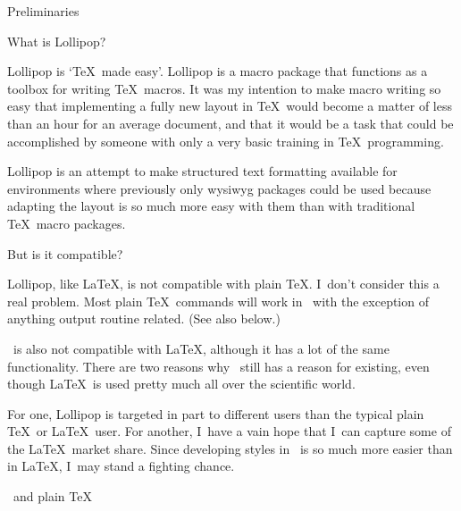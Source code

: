 %
%
%
%
%
%
 Preliminaries

\Section What is Lollipop?

Lollipop is `\TeX\ made easy'. Lollipop is a macro package
that functions as a toolbox for writing \TeX\ macros. It was my
intention to make macro writing so easy that implementing a fully new
layout in \TeX\ would become a matter of less than an hour for an
average document, and that it would be a task that could be
accomplished by someone with only a very basic training in \TeX\
programming.

Lollipop is an attempt to make structured text formatting available
for environments where previously only wysiwyg packages could be used
because adapting the layout is so much more easy with them than with
traditional \TeX\ macro packages.

\Section But is it compatible?

Lollipop, like \LaTeX, is not compatible with plain \TeX. I~don't
consider this a real problem. Most plain \TeX\ commands will work in
\Lollipop\ with the exception of anything output routine related.
(See also below.)

\Lollipop\ is also not compatible with \LaTeX, although it has a lot
of the same functionality. There are two reasons why \Lollipop\ still
has a reason for existing, even though \LaTeX\ is used pretty much
all over the scientific world.

For one, Lollipop is targeted in part
to different users than the typical plain \TeX\ or
\LaTeX\ user. For another, I~have a vain hope that I~can capture some
of the \LaTeX\ market share. Since developing styles in \Lollipop\ is
so much more easier than in \LaTeX, I~may stand a fighting chance.

\SubSection \Lollipop\ and plain \TeX

